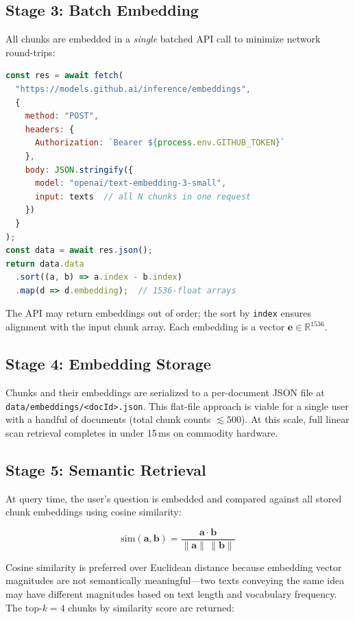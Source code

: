\documentclass[conference]{IEEEtran}
\begin{document}
\subsection{Stage 3: Batch Embedding}

All chunks are embedded in a \emph{single} batched API call to minimize network round-trips:

\begin{lstlisting}[language=JavaScript, caption={Batched embedding via GitHub Models API}]
const res = await fetch(
  "https://models.github.ai/inference/embeddings",
  {
    method: "POST",
    headers: {
      Authorization: `Bearer ${process.env.GITHUB_TOKEN}`
    },
    body: JSON.stringify({
      model: "openai/text-embedding-3-small",
      input: texts  // all N chunks in one request
    })
  }
);
const data = await res.json();
return data.data
  .sort((a, b) => a.index - b.index)
  .map(d => d.embedding);  // 1536-float arrays
\end{lstlisting}

The API may return embeddings out of order; the sort by \texttt{index} ensures alignment with the input chunk array. Each embedding is a vector $\mathbf{e} \in \mathbb{R}^{1536}$.

\subsection{Stage 4: Embedding Storage}

Chunks and their embeddings are serialized to a per-document JSON file at \texttt{data/embeddings/<docId>.json}. This flat-file approach is viable for a single user with a handful of documents (total chunk counts $\lesssim 500$). At this scale, full linear scan retrieval completes in under 15\,ms on commodity hardware.

\subsection{Stage 5: Semantic Retrieval}

At query time, the user's question is embedded and compared against all stored chunk embeddings using cosine similarity:

\begin{equation}
  \text{sim}(\mathbf{a}, \mathbf{b}) = \frac{\mathbf{a} \cdot \mathbf{b}}{\|\mathbf{a}\| \, \|\mathbf{b}\|}
  \label{eq:cosine}
\end{equation}

Cosine similarity is preferred over Euclidean distance because embedding vector magnitudes are not semantically meaningful---two texts conveying the same idea may have different magnitudes based on text length and vocabulary frequency. The top-$k = 4$ chunks by similarity score are returned:
\end{document}
